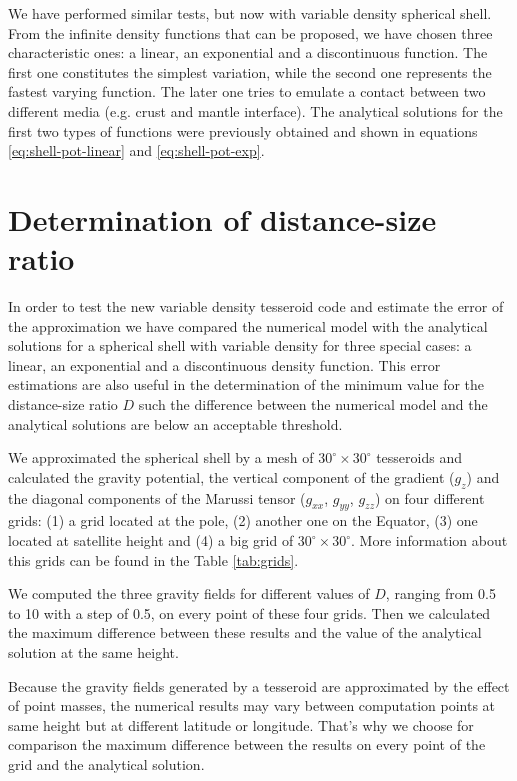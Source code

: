 \documentclass[extra]{gji}
\begin{document}
We have performed similar tests, but now with variable density spherical shell.
From the infinite density functions that can be proposed, we have chosen three characteristic ones: a linear, an exponential and a discontinuous function.
The first one constitutes the simplest variation, while the second one represents the fastest varying function. The later one tries to emulate a contact between two different media (e.g. crust and mantle interface).
The analytical solutions for the first two types of functions were previously obtained and shown in equations \ref{eq:shell-pot-linear} and \ref{eq:shell-pot-exp}.



\section{Determination of distance-size ratio}

In order to test the new variable density tesseroid code and estimate the error of the approximation we have compared the numerical model with the analytical solutions for a spherical shell with variable density for three special cases: a linear, an exponential and a discontinuous density function.
This error estimations are also useful in the determination of the minimum value for the distance-size ratio $D$ such the difference between the numerical model and the analytical solutions are below an acceptable threshold.

We approximated the spherical shell by a mesh of $30^\circ \times 30^\circ$ tesseroids and calculated the gravity potential, the vertical component of the gradient ($g_z$) and the diagonal components of the Marussi tensor ($g_{xx}$, $g_{yy}$, $g_{zz}$) on four different grids: (1) a grid located at the pole, (2) another one on the Equator, (3) one located at satellite height and (4) a big grid of $30^\circ \times 30^\circ$.
More information about this grids can be found in the Table \ref{tab:grids}.

We computed the three gravity fields for different values of $D$, ranging from 0.5 to 10 with a step of 0.5, on every point of these four grids.
Then we calculated the maximum difference between these results and the value of the analytical solution at the same height.

Because the gravity fields generated by a tesseroid are approximated by the effect of point masses, the numerical results may vary between computation points at same height but at different latitude or longitude.
That's why we choose for comparison the maximum difference between the results on every point of the grid and the analytical solution.
\end{document}
